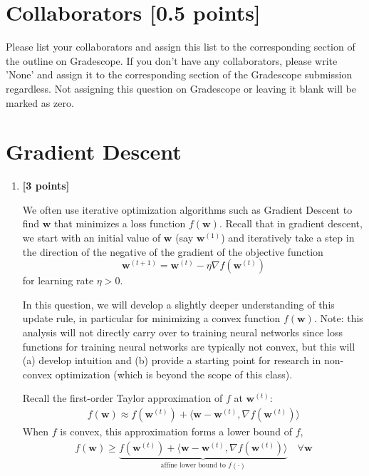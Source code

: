 \documentclass[11pt,english]{article}
\begin{document}
\section{Collaborators [0.5 points]}

Please list your collaborators and assign this list to the corresponding section of the outline on Gradescope. If you don't have any collaborators, please write 'None' and assign it to the corresponding section of the Gradescope submission regardless. Not assigning this question on Gradescope or leaving it blank will be marked as zero.

\section{Gradient Descent}
\begin{enumerate}[start=1]

\item
\textbf{[3 points]}

We often use iterative optimization algorithms such as Gradient Descent to
find $\mathbf{w}$ that minimizes a loss function $f(\mathbf{w})$. Recall that in gradient descent,
we start with an initial value of $\mathbf{w}$ (say $\mathbf{w}^{(1)}$) and iteratively take a step in the direction
of the negative of the gradient of the objective function \ie
\begin{equation}
\mathbf{w}^{(t+1)} = \mathbf{w}^{(t)} - \eta\nabla f(\mathbf{w}^{(t)})
\end{equation}
for learning rate $\eta > 0$.

In this question, we will develop a slightly deeper understanding of this update rule, in particular for 
minimizing a convex function $f(\mathbf{w})$. Note: this analysis will not directly carry over to training neural networks 
since loss functions for training neural networks are typically not convex, but this will (a) develop intuition 
and (b) provide a starting point for research in non-convex optimization (which is beyond the scope of this class). 


Recall the first-order Taylor approximation of $f$ at $\mathbf{w}^{(t)}$:
\begin{align}\label{first-order-approx}
f(\mathbf{w}) \approx f(\mathbf{w}^{(t)}) + \langle \mathbf{w}-\mathbf{w}^{(t)},
\nabla f(\mathbf{w}^{(t)}) \rangle
\end{align}
When $f$ is convex, this approximation forms a lower bound of $f$, \ie 
\begin{align}
f(\mathbf{w}) \ge 
\underbrace{
f(\mathbf{w}^{(t)}) + \langle \mathbf{w}-\mathbf{w}^{(t)}, 
\nabla f(\mathbf{w}^{(t)}) \rangle
}_{\text{affine lower bound to $f(\cdot)$}}
 \quad \forall \mathbf{w}
\end{align}


\end{enumerate}
\end{document}

